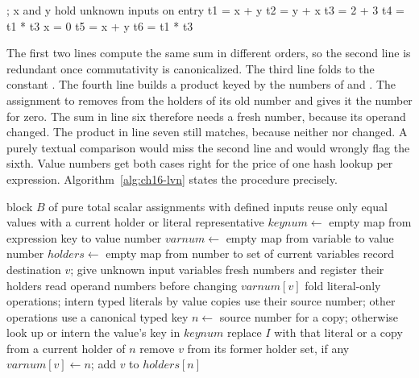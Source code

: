 \begin{irlisting}[caption={A block with local redundancies, a kill, and a surviving repetition.},label={lst:ch16-block}]
; x and y hold unknown inputs on entry
t1 = x + y
t2 = y + x
t3 = 2 + 3
t4 = t1 * t3
x = 0
t5 = x + y
t6 = t1 * t3
\end{irlisting}

The first two lines compute the same sum in different orders, so the second line is redundant once commutativity is canonicalized.
The third line folds to the constant .
The fourth line builds a product keyed by the numbers of  and .
The assignment to  removes  from the holders of its old number and gives it the number for zero.
The sum in line six therefore needs a fresh number, because its operand changed.
The product in line seven still matches, because neither  nor  changed.
A purely textual comparison would miss the second line and would wrongly flag the sixth.
Value numbers get both cases right for the price of one hash lookup per expression.
Algorithm~\ref{alg:ch16-lvn} states the procedure precisely.

\begin{algorithm}
  \caption{Local value numbering with current value holders}\label{alg:ch16-lvn}
  \begin{pseudocode}
    \Require block $B$ of pure total scalar assignments with defined inputs
    \Ensure reuse only equal values with a current holder or literal representative
    \State $keynum \gets$ empty map from expression key to value number
    \State $varnum \gets$ empty map from variable to value number
    \State $holders \gets$ empty map from number to set of current variables
      \State record destination $v$; give unknown input variables fresh numbers and register their holders
      \State read operand numbers before changing $varnum[v]$
      \State fold literal-only operations; intern typed literals by value
      \State copies use their source number; other operations use a canonical typed key
      \State $n \gets$ source number for a copy; otherwise look up or intern the value's key in $keynum$
        \State replace $I$ with that literal or a copy from a current holder of $n$
      \EndIf
      \State remove $v$ from its former holder set, if any
      \State $varnum[v] \gets n$; add $v$ to $holders[n]$
    \EndFor
  \end{pseudocode}
\end{algorithm}

